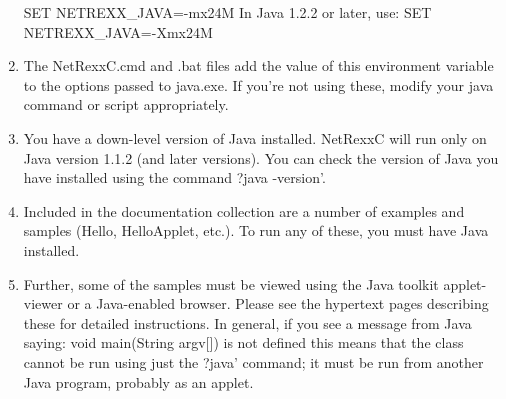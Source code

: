 \begin{enumerate}
  SET NETREXX\_JAVA=-mx24M
In Java 1.2.2 or later, use:
  SET NETREXX\_JAVA=-Xmx24M
\item The NetRexxC.cmd and .bat files add the value of this environment variable to the options passed to java.exe. If you're not using these, modify your java command or script appropriately.
\item You have a down-level version of Java installed. NetRexxC will run only on Java version 1.1.2 (and later versions). You can check the version of Java you have installed using the command ?java -version’.
\item Included in the documentation collection are a number of examples and samples (Hello, HelloApplet, etc.). To run any of these, you must have Java installed.
\item Further, some of the samples must be viewed using the Java toolkit applet-viewer or a Java-enabled browser. Please see the hypertext pages describing these for detailed instructions. In general, if you see a message from Java saying:
  void main(String argv[]) is not defined
this means that the class cannot be run using just the ?java’ command; it must be run from another Java program, probably as an applet.
\end{enumerate} 